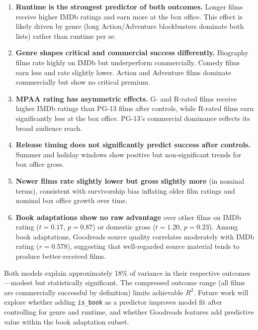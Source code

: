 \documentclass[11pt]{article}
\begin{document}
\begin{enumerate}
  \item \textbf{Runtime is the strongest predictor of both outcomes.} Longer films receive higher IMDb ratings and earn more at the box office. This effect is likely driven by genre (long Action/Adventure blockbusters dominate both lists) rather than runtime per se.

  \item \textbf{Genre shapes critical and commercial success differently.} Biography films rate highly on IMDb but underperform commercially. Comedy films earn less and rate slightly lower. Action and Adventure films dominate commercially but show no critical premium.

  \item \textbf{MPAA rating has asymmetric effects.} G- and R-rated films receive higher IMDb ratings than PG-13 films after controls, while R-rated films earn significantly less at the box office. PG-13's commercial dominance reflects its broad audience reach.

  \item \textbf{Release timing does not significantly predict success after controls.} Summer and holiday windows show positive but non-significant trends for box office gross.

  \item \textbf{Newer films rate slightly lower but gross slightly more} (in nominal terms), consistent with survivorship bias inflating older film ratings and nominal box office growth over time.

  \item \textbf{Book adaptations show no raw advantage} over other films on IMDb rating ($t = 0.17$, $p = 0.87$) or domestic gross ($t = 1.20$, $p = 0.23$). Among book adaptations, Goodreads source quality correlates moderately with IMDb rating ($r = 0.578$), suggesting that well-regarded source material tends to produce better-received films.
\end{enumerate}

Both models explain approximately 18\% of variance in their respective outcomes---modest but statistically significant. The compressed outcome range (all films are commercially successful by definition) limits achievable $R^2$. Future work will explore whether adding \texttt{is\_book} as a predictor improves model fit after controlling for genre and runtime, and whether Goodreads features add predictive value within the book adaptation subset.
\end{document}
